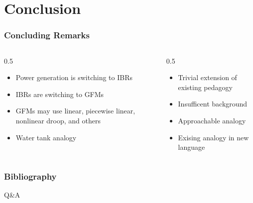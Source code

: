 \documentclass[
    aspectratio=169,
    \ifdefined\HANDOUT
    handout
    \else
    \fi
]{beamer}
\begin{document}
\section{Conclusion}
\begin{frame}
    \frametitle{Concluding Remarks}
    \begin{columns}
        \begin{column}{0.5\textwidth}
            \begin{itemize}
                \item Power generation is switching to IBRs
                \item IBRs are switching to GFMs
                \item GFMs may use linear, piecewise linear, nonlinear droop, and others
                \item Water tank analogy
            \end{itemize}
        \end{column}
        \begin{column}{0.5\textwidth}
            \begin{itemize}
                \item Trivial extension of existing pedagogy
                \item Insufficent background
                \item Approachable analogy
                \item Exising analogy in new language
            \end{itemize}
        \end{column}
    \end{columns}
\end{frame}
\begin{frame}
    \frametitle{Bibliography}
    
    {
        
    }
\end{frame}
\begin{frame}
    \begin{center}
        \vspace{20pt}
        {
            \Huge
            Q\&A
        }
    \end{center}
\end{frame}
\end{document}
